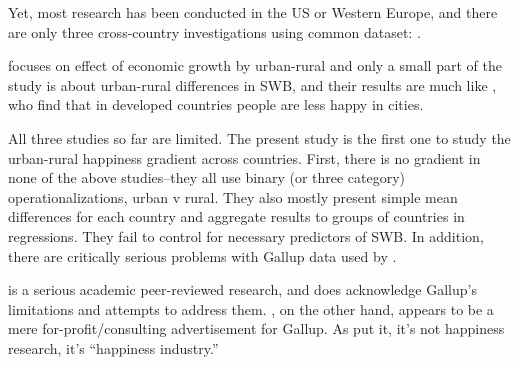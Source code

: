 \documentclass[10pt, letterpaper]{article}
\begin{document}
Yet, most research has been conducted in the US or Western Europe, and there are
only three cross-country investigations using common dataset: \citet{aokcities,easterlin10al,burger20}.

\citet{easterlin10al} focuses on effect of economic growth by urban-rural and only a
small part of the study is about urban-rural differences in SWB, and their
results are much like \citet{aokcities}, who find that in developed countries
people are less happy in cities.

All three studies so far are limited. %
%
The present study is the first one to study the urban-rural happiness gradient
across countries. First, there is no gradient in none of the above studies--they
all use binary (or three category) operationalizations, urban v rural. They
also mostly present simple mean differences for each country and aggregate
results to groups of countries in regressions. They fail to control for
necessary predictors of SWB. In addition, there are critically serious problems
with Gallup data used by \citet{easterlin10al,burger20}. 

\citet{easterlin10al} is a serious academic peer-reviewed research, and does acknowledge Gallup's limitations and attempts
to address them. \citet{burger20}, on the other hand, appears to be a mere
for-profit/consulting advertisement for Gallup. As \citet{davies15} put it, it's
not happiness research, it's ``happiness industry.''


\end{document}
